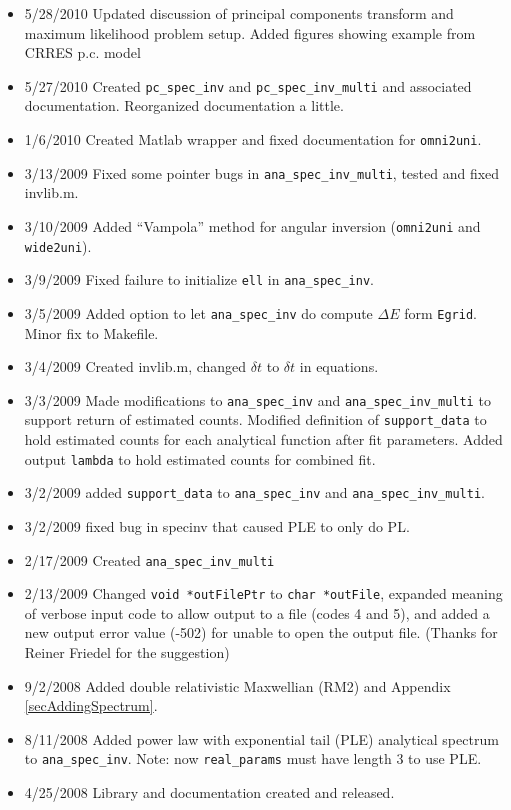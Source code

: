 \documentclass{article}    %
\begin{document}
\begin{itemize}
\item{5/28/2010} Updated discussion of principal components transform and maximum likelihood problem setup. Added figures showing example from CRRES p.c. model
\item{5/27/2010} Created \verb|pc_spec_inv| and \verb|pc_spec_inv_multi| and associated documentation. Reorganized documentation a little.
\item{1/6/2010} Created Matlab wrapper and fixed documentation for \verb|omni2uni|.
\item{3/13/2009} Fixed some pointer bugs in \verb|ana_spec_inv_multi|, tested and fixed invlib.m.
\item{3/10/2009} Added ``Vampola'' method for angular inversion (\verb|omni2uni| and \verb|wide2uni|).
\item{3/9/2009} Fixed failure to initialize \verb|ell| in \verb|ana_spec_inv|.
\item{3/5/2009} Added option to let \verb|ana_spec_inv| do compute $\Delta E$ form \verb|Egrid|. Minor fix to Makefile.
\item{3/4/2009} Created invlib.m, changed $\delta t$ to $\delta t$ in equations.
\item{3/3/2009} Made modifications to \verb|ana_spec_inv| and \verb|ana_spec_inv_multi| to support return of estimated counts.
\subitem Modified definition of \verb|support_data| to hold estimated counts for each analytical function after fit parameters.
\subitem Added output \verb|lambda| to hold estimated counts for combined fit.
\item{3/2/2009} added \verb|support_data| to \verb|ana_spec_inv| and \verb|ana_spec_inv_multi|.
\item{3/2/2009} fixed bug in specinv that caused PLE to only do PL.
\item{2/17/2009} Created \verb|ana_spec_inv_multi|
\item{2/13/2009} Changed \verb|void *outFilePtr| to \verb|char *outFile|, 
  expanded meaning of verbose input code to allow output to a file (codes 4 and 5), 
  and added a new output error value (-502) for unable to open the output file. 
  (Thanks for Reiner Friedel for the suggestion)
\item{9/2/2008} Added double relativistic Maxwellian (RM2) and Appendix \ref{secAddingSpectrum}.
\item{8/11/2008} Added power law with exponential tail (PLE)
  analytical spectrum to \verb|ana_spec_inv|. Note: now
  \verb|real_params| must have length 3 to use PLE.
\item{4/25/2008} Library and documentation created and released.
\end{itemize}
\end{document}
